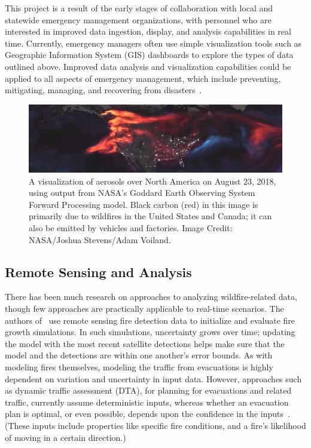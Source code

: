 This project is a result of the early stages of collaboration with local and statewide emergency management organizations, with personnel who are interested in improved data ingestion, display, and analysis capabilities in real time. Currently, emergency managers often use simple visualization tools such as Geographic Information System (GIS) dashboards to explore the types of data outlined above. Improved data analysis and visualization capabilities could be applied to all aspects of emergency management, which include preventing, mitigating, managing, and recovering from disasters~\cite{Akter2017}.
% 
% 
\begin{figure}[t]      \includegraphics[width=\textwidth]{images/remote_sensing/aerosols_cropped.jpg}
  \caption{A visualization of aerosols over North America on August 23, 2018, using output from NASA's Goddard Earth Observing System Forward Processing model. Black carbon (red) in this image is primarily due to wildfires in the United States and Canada; it can also be emitted by vehicles and factories. Image Credit: NASA/Joshua Stevens/Adam Voiland.}
  \label{teaser}
  \end{figure}
  
\subsection{Remote Sensing and Analysis}
There has been much research on approaches to analyzing wildfire-related data, though few approaches are practically applicable to real-time scenarios. The authors of~\cite{Coen2013} use remote sensing fire detection data to initialize and evaluate fire growth simulations. In such simulations, uncertainty grows over time; updating the model with the most recent satellite detections helps make sure that the model and the detections are within one another's error bounds. As with modeling fires themselves, modeling the traffic from evacuations is highly dependent on variation and uncertainty in input data. However, approaches such as dynamic traffic assessment (DTA), for planning for evacuations and related traffic, currently assume deterministic inputs, whereas whether an evacuation plan is optimal, or even possible, depends upon the confidence in the inputs~\cite{Yao2009}. (These inputs include properties like specific fire conditions,  and a fire's likelihood of moving in a certain direction.)



